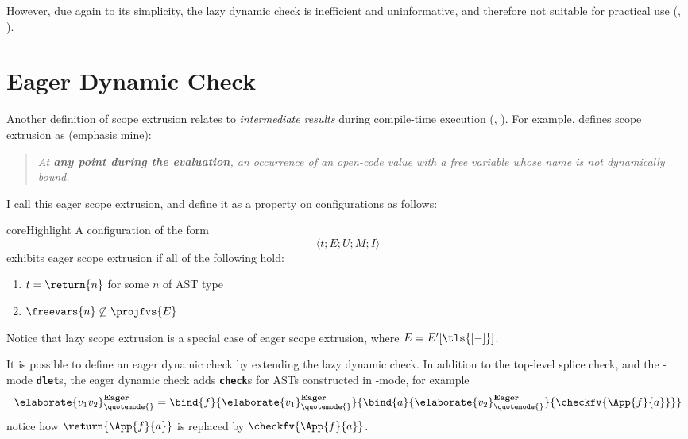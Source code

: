 However, due again to its simplicity, the lazy dynamic check is inefficient and uninformative, and therefore not suitable for practical use \citep{kiselyov-14} (, ).

\section{Eager Dynamic Check}\label{section:eager-dynamic-check-formal}
Another definition of scope extrusion relates to \textit{intermediate results} during compile-time execution (, ). For example, \citet{kiselyov-14} defines scope extrusion as (emphasis mine):

\begin{quote}
  \textit{At \textbf{any point during the evaluation}, an occurrence of an open-code value with a free variable whose name is not dynamically bound.}
\end{quote}

I call this eager scope extrusion, and define it as a property on \coreLang{} configurations as follows: 
\begin{definition}{coreHighlight} A \coreLang{} configuration of the form 
\[\langle t;E;U;M;I\rangle\]  
exhibits eager scope extrusion if all of the following hold:
  \begin{enumerate}
    \item $t = \return{n}$ for some $n$ of \textsf{AST} type
    \item $\freevars{n} \not\subseteq \projfvs{E}$
  \end{enumerate}
\end{definition}

Notice that lazy scope extrusion is a special case of eager scope extrusion, where $E = E'[\tls{[-]}]$. 

It is possible to define an eager dynamic check by extending the lazy dynamic check. In addition to the top-level splice check, and the \compilemode{}-mode \textbf{\texttt{dlet}}s, the eager dynamic check adds \textbf{\texttt{check}}s for ASTs constructed in \quotemode{}-mode, for example 
\[\elaborate{v_1 v_2}_{\quotemode{}}^{\textbf{Eager}} = \bind{f}{\elaborate{v_1}_{\quotemode{}}^{\textbf{Eager}}}{\bind{a}{\elaborate{v_2}_{\quotemode{}}^{\textbf{Eager}}}{\checkfv{\App{f}{a}}}}\]
notice how $\return{\App{f}{a}}$ is replaced by $\checkfv{\App{f}{a}}$. 

